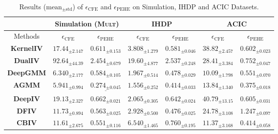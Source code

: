 \documentclass[journal]{IEEEtran}
\begin{document}
\begin{table}[t]
{
\caption{Results ($\text{mean}_{\pm \text{std}}$) of $\epsilon_{\text{CFE}}$ and $\epsilon_{\text{PEHE}}$ on Simulation, IHDP and ACIC Datasets.}
\label{tab:main}
\begin{center}
\setlength{\tabcolsep}{2mm}
{\small
\begin{tabular}{c|cc|cc|cc}
\toprule
 & \multicolumn{2}{c|}{\bf Simulation (\textsc{Mult})} & \multicolumn{2}{c|}{\bf IHDP}
& \multicolumn{2}{c}{\bf ACIC} \\
\midrule
Methods & \bf
$\epsilon_{\text{CFE}}$ & \bf $\epsilon_{\text{PEHE}}$ & \bf $\epsilon_{\text{CFE}}$ & \bf $\epsilon_{\text{PEHE}}$ & \bf $\epsilon_{\text{CFE}}$ & \bf $\epsilon_{\text{PEHE}}$ \\
\midrule


\bf KernelIV & $ 17.44_{\pm 2.147} $ & $ 0.611_{\pm 0.153} $  & $ 3.808_{\pm 1.279} $ & $ 0.581_{\pm 0.046} $  & $ 38.82_{\pm 2.457} $ & $ 0.602_{\pm 0.023} $ \\
\bf DualIV & $ 92.64_{\pm 44.39} $ & $ 2.454_{\pm 0.679} $  & $ 19.60_{\pm 4.877} $ & $ 2.537_{\pm 0.248} $  & $ 28.41_{\pm 3.384} $ & $ 0.752_{\pm 0.047} $ \\
\bf DeepGMM & $ 6.340_{\pm 2.177} $ & $ 0.584_{\pm 0.105} $  & $ 1.967_{\pm 0.514} $ & $ 0.478_{\pm 0.029} $  & $ 10.09_{\pm 1.798} $ & $ 0.551_{\pm 0.070} $ \\
\bf AGMM & \underline{$ 5.941_{\pm 0.994} $} & $ \underline{0.274_{\pm 0.045}} $  & $ 1.556_{\pm 0.252} $ & $ 0.414_{\pm 0.033} $  & $ 13.84_{\pm 1.340} $ & $ 0.375_{\pm 0.018} $ \\
\bf DeepIV & $ 19.13_{\pm 2.327} $ & $ 0.662_{\pm 0.021} $  & $ 2.065_{\pm 0.305} $ & $ 0.642_{\pm 0.024} $  & $ 40.79_{\pm 13.15} $ & $ 0.605_{\pm 0.031} $ \\
\bf DFIV & $ 11.73_{\pm 0.894} $ & $ 0.563_{\pm 0.025} $  & $ 2.928_{\pm 0.500} $ & $ 0.476_{\pm 0.025} $  & $ 24.78_{\pm 3.108} $ & $ 1.247_{\pm 0.097} $ \\
\bf CBIV & $ 11.61_{\pm 2.675} $ & $ 0.551_{\pm 0.116} $  & $ 6.540_{\pm 1.465} $ & $ 0.760_{\pm 0.195} $  & $ 11.37_{\pm 3.168} $ & $ 0.414_{\pm 0.058} $ \\
\midrule



\end{tabular}}
\end{center}}
\end{table}
\end{document}
